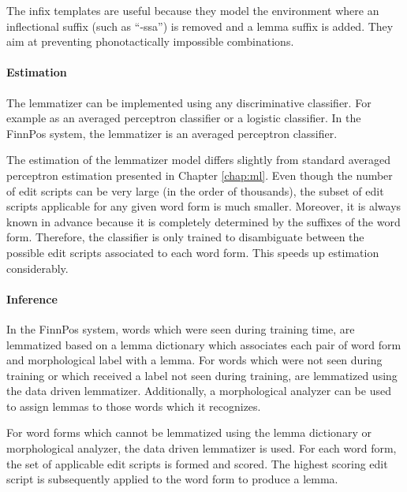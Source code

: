 The infix templates are useful because they model the environment
where an inflectional suffix (such as ``-ssa'') is removed and a lemma suffix
is added. They aim at preventing phonotactically impossible
combinations.

\paragraph{Estimation} The lemmatizer can be implemented using any
discriminative classifier. For example as an averaged perceptron
classifier or a logistic classifier. In the FinnPos system, the
lemmatizer is an averaged perceptron classifier.

The estimation of the lemmatizer model differs slightly from standard
averaged perceptron estimation presented in Chapter
\ref{chap:ml}. Even though the number of edit scripts can be very
large (in the order of thousands), the subset of edit scripts
applicable for any given word form is much smaller. Moreover, it is
always known in advance because it is completely determined by the
suffixes of the word form. Therefore, the classifier is only trained
to disambiguate between the possible edit scripts associated to each
word form. This speeds up estimation considerably.

\paragraph{Inference} In the FinnPos system, words which were seen
during training time, are lemmatized based on a lemma dictionary which
associates each pair of word form and morphological label with a
lemma. For words which were not seen during training or which received
a label not seen during training, are lemmatized using the data driven
lemmatizer. Additionally, a morphological analyzer can be used to
assign lemmas to those words which it recognizes.

For word forms which cannot be lemmatized using the lemma dictionary
or morphological analyzer, the data driven lemmatizer is used. For
each word form, the set of applicable edit scripts is formed and
scored. The highest scoring edit script is subsequently applied to the
word form to produce a lemma.

